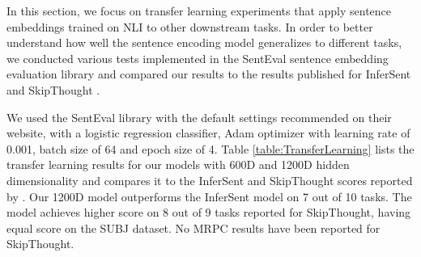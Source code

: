 \documentclass{nle}
\begin{document}
In this section, we focus on transfer learning experiments that apply sentence embeddings trained on NLI to other downstream tasks.
In order to better understand how well the sentence encoding model generalizes to different tasks, we conducted various tests implemented in the SentEval sentence embedding evaluation library \citep{infersent} and compared our results to the results published for InferSent and SkipThought \citep{KirosZSZTUF15}.

\begin{table*}[ht!]
\begin{center}
\end{center}
\caption{\label{table:TransferLearning} Transfer learning test results for the HBMP model on a number of SentEval downstream sentence embedding evaluation tasks. InferSent and SkipThought results as reported by \cite{infersent}. To remain consistent with other work using SentEval, we report the accuracies as they are provided by the SentEval library.}
\end{table*}

We used the SentEval library with the default settings recommended on their website, with a logistic regression classifier, Adam optimizer with learning rate of 0.001, batch size of 64 and epoch size of 4. Table \ref{table:TransferLearning} lists the transfer learning results for our models with 600D and 1200D hidden dimensionality and compares it to the InferSent and SkipThought scores reported by \cite{infersent}. Our 1200D model outperforms the InferSent model on 7 out of 10 tasks. The model achieves higher score on 8 out of 9 tasks reported for SkipThought, having equal score on the SUBJ dataset. No MRPC results have been reported for SkipThought.
\end{document}
